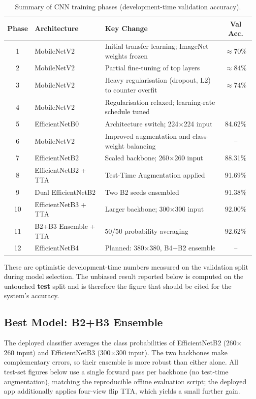 \begin{table}[H]
\centering
\caption{Summary of CNN training phases (development-time validation accuracy).}
\label{tab:training_history}
\begin{tabular}{|c|p{4.5cm}|p{5cm}|c|}
\hline
\textbf{Phase} & \textbf{Architecture} & \textbf{Key Change} & \textbf{Val Acc.} \\ \hline
1  & MobileNetV2 & Initial transfer learning; ImageNet weights frozen & $\approx$70\% \\ \hline
2  & MobileNetV2 & Partial fine-tuning of top layers & $\approx$84\% \\ \hline
3  & MobileNetV2 & Heavy regularisation (dropout, L2) to counter overfit & $\approx$74\% \\ \hline
4  & MobileNetV2 & Regularisation relaxed; learning-rate schedule tuned & -- \\ \hline
5  & EfficientNetB0 & Architecture switch; 224$\times$224 input & 84.62\% \\ \hline
6  & MobileNetV2 & Improved augmentation and class-weight balancing & -- \\ \hline
7  & EfficientNetB2 & Scaled backbone; 260$\times$260 input & 88.31\% \\ \hline
8  & EfficientNetB2 + TTA & Test-Time Augmentation applied & 91.69\% \\ \hline
9  & Dual EfficientNetB2 & Two B2 seeds ensembled & 91.38\% \\ \hline
10 & EfficientNetB3 + TTA & Larger backbone; 300$\times$300 input & 92.00\% \\ \hline
11 & B2+B3 Ensemble + TTA & 50/50 probability averaging & 92.62\% \\ \hline
12 & EfficientNetB4 & Planned: 380$\times$380, B4+B2 ensemble & -- \\ \hline
\end{tabular}
\end{table}

\noindent These are optimistic development-time numbers measured on the
validation split during model selection. The unbiased result reported below is
computed on the untouched \textbf{test} split and is therefore the figure that
should be cited for the system's accuracy.

\subsection{Best Model: B2+B3 Ensemble}

The deployed classifier averages the class probabilities of EfficientNetB2
(260$\times$260 input) and EfficientNetB3 (300$\times$300 input). The two
backbones make complementary errors, so their ensemble is more robust than
either alone. All test-set figures below use a single forward pass per backbone
(no test-time augmentation), matching the reproducible offline evaluation
script; the deployed app additionally applies four-view flip TTA, which yields a
small further gain.


